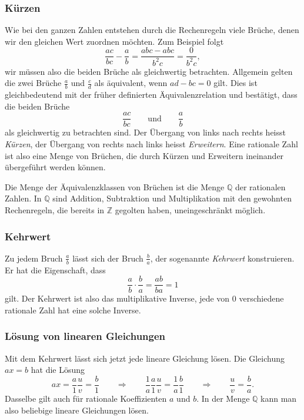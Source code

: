 \subsubsection{Kürzen}
Wie bei den ganzen Zahlen entstehen durch die Rechenregeln viele Brüche,
denen wir den gleichen Wert zuordnen möchten.
Zum Beispiel folgt
\[
\frac{ac}{bc} - \frac{a}{b} 
=
\frac{abc-abc}{b^2c}
=
\frac{0}{b^2c},
\]
wir müssen also die beiden Brüche als gleichwertig betrachten.
Allgemein gelten die zwei Brüche $\frac{a}{b}$ und $\frac{c}{d}$
als äquivalent, wenn $ad-bc= 0$ gilt.
Dies ist gleichbedeutend mit der früher definierten Äquivalenzrelation
und bestätigt, dass die beiden Brüche
\[
\frac{ac}{bc} 
\qquad\text{und}\qquad
\frac{a}{b}
\]
als gleichwertig zu betrachten sind.
Der Übergang von links nach rechts heisst {\em Kürzen},
%
der Übergang von rechts nach links heisst {\em Erweitern}.
%
Eine rationale Zahl ist also eine Menge von Brüchen, die durch
Kürzen und Erweitern ineinander übergeführt werden können.

Die Menge der Äquivalenzklassen von Brüchen ist die Menge $\mathbb{Q}$
der rationalen Zahlen.
%
In $\mathbb{Q}$ sind Addition, Subtraktion und Multiplikation mit den
gewohnten Rechenregeln, die bereits in $\mathbb{Z}$ gegolten haben,
uneingeschränkt möglich.

\subsubsection{Kehrwert}
Zu jedem Bruch $\frac{a}{b}$ lässt sich der Bruch $\frac{b}{a}$,
der sogenannte {\em Kehrwert}
%
konstruieren.
Er hat die Eigenschaft, dass
\[
\frac{a}{b}\cdot\frac{b}{a}
=
\frac{ab}{ba}
=
1
\]
gilt.
Der Kehrwert ist also das multiplikative Inverse, jede von $0$ verschiedene
rationale Zahl hat eine solche Inverse.

\subsubsection{Lösung von linearen Gleichungen}
Mit dem Kehrwert lässt sich jetzt jede lineare Gleichung lösen.
%
Die Gleichung $ax=b$ hat die Lösung
\[
ax = \frac{a}{1} \frac{u}{v} = \frac{b}{1}
\qquad\Rightarrow\qquad
\frac{1}{a}
 \frac{a}{1} \frac{u}{v} = \frac{1}{a}\frac{b}{1} 
\qquad\Rightarrow\qquad
\frac{u}{v} = \frac{b}{a}.
\]
Dasselbe gilt auch für rationale Koeffizienten $a$ und $b$.
In der Menge $\mathbb{Q}$ kann man also beliebige lineare Gleichungen
lösen.

